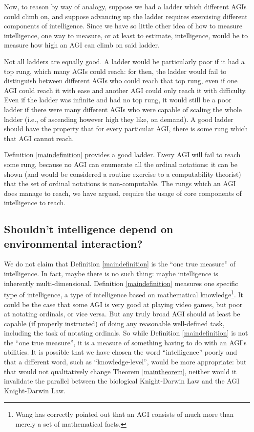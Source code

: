 \documentclass[runningheads]{llncs}
\begin{document}
Now, to reason by way of analogy, suppose we had a ladder which different AGIs
could climb on, and suppose advancing up the ladder requires exercising different
components of intelligence. Since we have so little other idea of how to measure
intelligence, one way to measure, or at least to estimate, intelligence, would be
to measure how high an AGI can climb on said ladder.

Not all ladders are equally good. A ladder would be particularly poor if it had
a top rung, which many AGIs could reach: for then, the ladder would fail to
distinguish between different AGIs who could reach that top rung, even if one
AGI could reach it with ease and another AGI could only reach it with difficulty.
Even if the ladder was infinite and had no top rung, it would still be a poor
ladder if there were many different AGIs who were capable of scaling the whole
ladder (i.e., of ascending however high they like, on demand). A good ladder
should have the property that for every particular AGI, there is some rung which
that AGI cannot reach.

Definition \ref{maindefinition} provides a good ladder. Every AGI will fail to
reach some rung, because no AGI can enumerate all the ordinal notations: it can
be shown (and would be considered a routine exercise to a computability theorist)
that the set of ordinal notations is non-computable. The rungs which an AGI does
manage to reach, we have argued, require the usage of core components of intelligence
to reach.

\subsection{Shouldn't intelligence depend on environmental interaction?}

We do not claim that Definition \ref{maindefinition} is the ``one true measure'' of
intelligence. In fact, maybe there is no such thing: maybe intelligence is inherently
multi-dimensional. Definition \ref{maindefinition} measures one specific type of
intelligence, a type of intelligence based on mathematical knowledge\footnote{Wang has
correctly pointed out \cite{wang2007} that an AGI consists of much more than merely
a set of mathematical facts.}. It could be the
case that some AGI is very good at playing video games, but poor at notating ordinals,
or vice versa. But any truly broad AGI should at least be capable (if properly
instructed) of doing any reasonable well-defined task, including the task of
notating ordinals.
So while Definition \ref{maindefinition} is not the ``one true measure'', it is a
measure of something having to do with an AGI's abilities. It is possible that we
have chosen the word ``intelligence'' poorly and that a different word, such as
``knowledge-level'', would be more appropriate: but that would not qualitatively change
Theorem \ref{maintheorem}, neither would it
invalidate the parallel between the biological Knight-Darwin Law and the
AGI Knight-Darwin Law.
\end{document}
